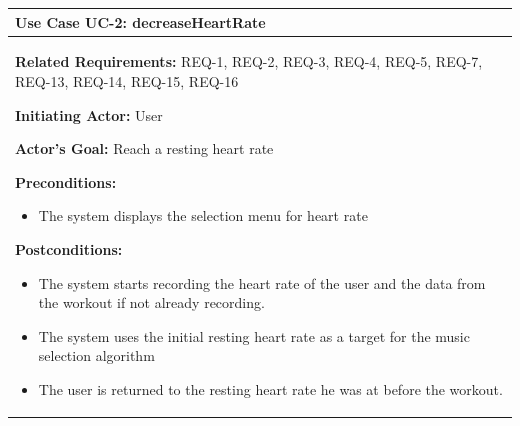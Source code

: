 \documentclass[letterpaper,english, 12pt]{scrreprt}
\begin{document}
\begin{center}
        \begin{tabular}{|C{15cm}|}
                \hline
                        \textbf{Use Case UC-2: decreaseHeartRate}\\
                \hline
                        \begin{flushleft}
                                \textbf{Related Requirements: } REQ-1, REQ-2, REQ-3, REQ-4, REQ-5, REQ-7, REQ-13, REQ-14, REQ-15, REQ-16
                        \end{flushleft}
                        \begin{flushleft}
                                \textbf{Initiating Actor: } User
                        \end{flushleft}
                        \begin{flushleft}
                                \textbf{Actor's Goal: } Reach a resting heart rate
                        \end{flushleft}
                        \begin{flushleft}
                                \textbf{Preconditions: }
                        \end{flushleft}
                                \begin{itemize}
                                        \item The system displays the selection menu for heart rate
                                \end{itemize}
                        \begin{flushleft}
                                \textbf{Postconditions: }
                        \end{flushleft}
                                \begin{itemize}
                                        \item The system starts recording the heart rate of the user and the data from the workout if not already recording.
                                        \item The system uses the initial resting heart rate as a target for the music selection algorithm
                                        \item The user is returned to the resting heart rate he was at before the workout.
                                \end{itemize}
                        \begin{flushleft}

\end{flushleft}
\end{tabular}
\end{center}
\end{document}
